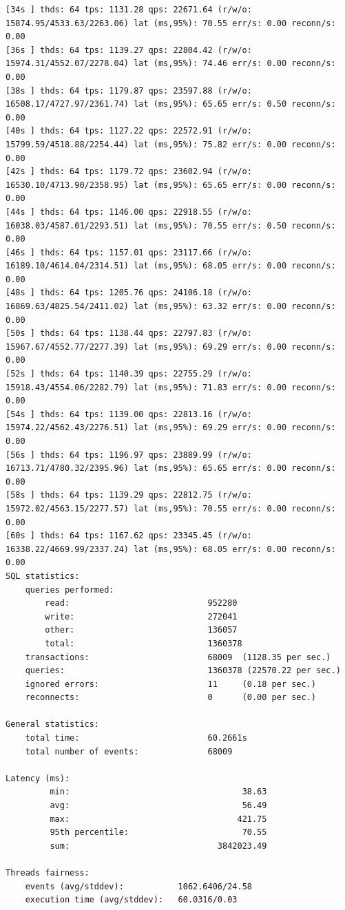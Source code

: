 \documentclass{article}
\begin{document}
\begin{verbatim}
[34s ] thds: 64 tps: 1131.28 qps: 22671.64 (r/w/o: 15874.95/4533.63/2263.06) lat (ms,95%): 70.55 err/s: 0.00 reconn/s: 0.00
[36s ] thds: 64 tps: 1139.27 qps: 22804.42 (r/w/o: 15974.31/4552.07/2278.04) lat (ms,95%): 74.46 err/s: 0.00 reconn/s: 0.00
[38s ] thds: 64 tps: 1179.87 qps: 23597.88 (r/w/o: 16508.17/4727.97/2361.74) lat (ms,95%): 65.65 err/s: 0.50 reconn/s: 0.00
[40s ] thds: 64 tps: 1127.22 qps: 22572.91 (r/w/o: 15799.59/4518.88/2254.44) lat (ms,95%): 75.82 err/s: 0.00 reconn/s: 0.00
[42s ] thds: 64 tps: 1179.72 qps: 23602.94 (r/w/o: 16530.10/4713.90/2358.95) lat (ms,95%): 65.65 err/s: 0.00 reconn/s: 0.00
[44s ] thds: 64 tps: 1146.00 qps: 22918.55 (r/w/o: 16038.03/4587.01/2293.51) lat (ms,95%): 70.55 err/s: 0.50 reconn/s: 0.00
[46s ] thds: 64 tps: 1157.01 qps: 23117.66 (r/w/o: 16189.10/4614.04/2314.51) lat (ms,95%): 68.05 err/s: 0.00 reconn/s: 0.00
[48s ] thds: 64 tps: 1205.76 qps: 24106.18 (r/w/o: 16869.63/4825.54/2411.02) lat (ms,95%): 63.32 err/s: 0.00 reconn/s: 0.00
[50s ] thds: 64 tps: 1138.44 qps: 22797.83 (r/w/o: 15967.67/4552.77/2277.39) lat (ms,95%): 69.29 err/s: 0.00 reconn/s: 0.00
[52s ] thds: 64 tps: 1140.39 qps: 22755.29 (r/w/o: 15918.43/4554.06/2282.79) lat (ms,95%): 71.83 err/s: 0.00 reconn/s: 0.00
[54s ] thds: 64 tps: 1139.00 qps: 22813.16 (r/w/o: 15974.22/4562.43/2276.51) lat (ms,95%): 69.29 err/s: 0.00 reconn/s: 0.00
[56s ] thds: 64 tps: 1196.97 qps: 23889.99 (r/w/o: 16713.71/4780.32/2395.96) lat (ms,95%): 65.65 err/s: 0.00 reconn/s: 0.00
[58s ] thds: 64 tps: 1139.29 qps: 22812.75 (r/w/o: 15972.02/4563.15/2277.57) lat (ms,95%): 70.55 err/s: 0.00 reconn/s: 0.00
[60s ] thds: 64 tps: 1167.62 qps: 23345.45 (r/w/o: 16338.22/4669.99/2337.24) lat (ms,95%): 68.05 err/s: 0.00 reconn/s: 0.00
SQL statistics:
    queries performed:
        read:                            952280
        write:                           272041
        other:                           136057
        total:                           1360378
    transactions:                        68009  (1128.35 per sec.)
    queries:                             1360378 (22570.22 per sec.)
    ignored errors:                      11     (0.18 per sec.)
    reconnects:                          0      (0.00 per sec.)

General statistics:
    total time:                          60.2661s
    total number of events:              68009

Latency (ms):
         min:                                   38.63
         avg:                                   56.49
         max:                                  421.75
         95th percentile:                       70.55
         sum:                              3842023.49

Threads fairness:
    events (avg/stddev):           1062.6406/24.58
    execution time (avg/stddev):   60.0316/0.03
\end{verbatim}
\end{document}
